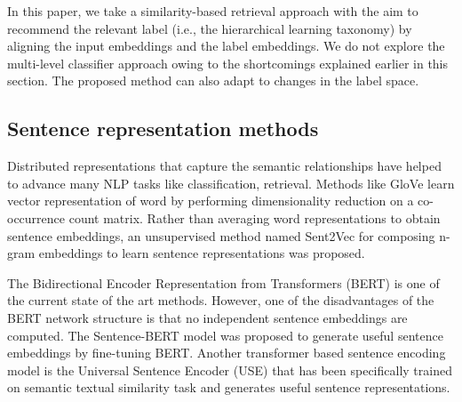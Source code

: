 \documentclass[runningheads, envcountsame, a4paper]{llncs}
\begin{document}
\setlength{\parindent}{4ex}In this paper, we take a similarity-based retrieval approach with the aim to recommend the relevant label (i.e., the hierarchical learning taxonomy) by aligning the input embeddings and the label embeddings. We do not explore the multi-level classifier approach owing to the shortcomings explained earlier in this section. The proposed method can also adapt to changes in the label space.


\subsection{Sentence representation methods}
Distributed representations that capture the semantic relationships \cite{10.5555/2999792.2999959} have helped to advance many NLP tasks like classification, retrieval. Methods like GloVe \cite{pennington-etal-2014-glove} learn vector representation of word by performing dimensionality reduction on a co-occurrence count matrix. Rather than averaging word representations to obtain sentence embeddings, an unsupervised method named Sent2Vec \cite{pagliardini2017unsupervised} for composing n-gram embeddings to learn sentence representations was proposed.

The Bidirectional Encoder Representation from Transformers (BERT) \cite{BERT} is one of the current state of the art methods. However, one of the disadvantages of the BERT network structure is that no independent sentence embeddings are computed.
The Sentence-BERT \cite{reimers-gurevych-2019-sentence} model was proposed to generate useful sentence embeddings by fine-tuning BERT. Another transformer based sentence encoding model is the Universal Sentence Encoder (USE) \cite{cer-etal-2018-universal}  that has been specifically trained on semantic textual similarity task and generates useful sentence representations.
\end{document}

